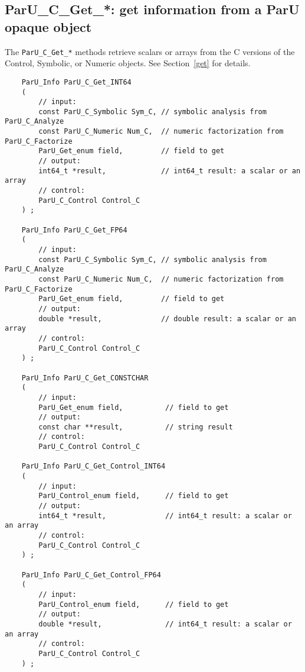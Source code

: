 \documentclass[12pt]{article}
\begin{document}
\subsection{{\sf ParU\_C\_Get\_*}: get information from a ParU opaque object}

The \verb'ParU_C_Get_*' methods retrieve scalars or arrays from the C versions
of the Control, Symbolic, or Numeric objects.  See Section~\ref{get} for
details.

    {\footnotesize
    \begin{verbatim}
    ParU_Info ParU_C_Get_INT64
    (
        // input:
        const ParU_C_Symbolic Sym_C, // symbolic analysis from ParU_C_Analyze
        const ParU_C_Numeric Num_C,  // numeric factorization from ParU_C_Factorize
        ParU_Get_enum field,         // field to get
        // output:
        int64_t *result,             // int64_t result: a scalar or an array
        // control:
        ParU_C_Control Control_C
    ) ;

    ParU_Info ParU_C_Get_FP64
    (
        // input:
        const ParU_C_Symbolic Sym_C, // symbolic analysis from ParU_C_Analyze
        const ParU_C_Numeric Num_C,  // numeric factorization from ParU_C_Factorize
        ParU_Get_enum field,         // field to get
        // output:
        double *result,              // double result: a scalar or an array
        // control:
        ParU_C_Control Control_C
    ) ;

    ParU_Info ParU_C_Get_CONSTCHAR
    (
        // input:
        ParU_Get_enum field,          // field to get
        // output:
        const char **result,          // string result
        // control:
        ParU_C_Control Control_C

    ParU_Info ParU_C_Get_Control_INT64
    (
        // input:
        ParU_Control_enum field,      // field to get
        // output:
        int64_t *result,              // int64_t result: a scalar or an array
        // control:
        ParU_C_Control Control_C
    ) ;

    ParU_Info ParU_C_Get_Control_FP64
    (
        // input:
        ParU_Control_enum field,      // field to get
        // output:
        double *result,               // int64_t result: a scalar or an array
        // control:
        ParU_C_Control Control_C
    ) ; \end{verbatim} }
\end{document}
